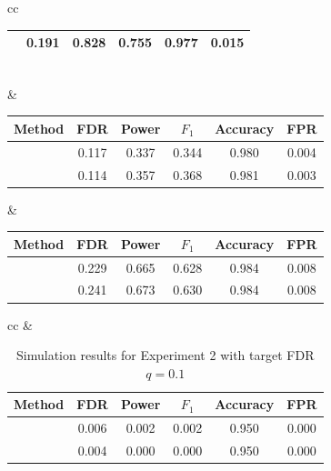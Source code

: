 ﻿\documentclass[12pt]{article}
\newcommand{\0}{\mbox{\bf 0}}
\theoremstyle{plain}%
\theoremstyle{definition}
\begin{document}
{\begin{table}[htbp]
\begin{tabular}{cc}
\begin{tabular}{lccccc}
\sc{Screening+Fixed-X} & 0.191 & 0.828 & 0.755 & 0.977 & 0.015 \\

			\bottomrule
		\end{tabular}
		\\[1em]
		
		 &  \\
		\begin{tabular}{lccccc}
			\toprule
			Method & FDR & Power & $F_1$ & Accuracy & FPR \\
			\midrule
\sc{Screening+Model-X} & 0.117 & 0.337 & 0.344 & 0.980 & 0.004 \\

\sc{Screening+Fixed-X} & 0.114 & 0.357 & 0.368 & 0.981 & 0.003 \\

			\bottomrule
		\end{tabular}
		&
		\begin{tabular}{lccccc}
			\toprule
			Method & FDR & Power & $F_1$ & Accuracy & FPR \\
			\midrule
\sc{Screening+Model-X} & 0.229 & 0.665 & 0.628 & 0.984 & 0.008 \\

\sc{Screening+Fixed-X} & 0.241 & 0.673 & 0.630 & 0.984 & 0.008 \\

			\bottomrule
		\end{tabular}
	\end{tabular}
\end{table}


\begin{table}[htbp]
\caption{Simulation results for Experiment 2 with target FDR $q = 0.1$}
\label{tab:dgp2A_fdr0.1}
\centering
\scriptsize
\setlength{\tabcolsep}{2pt}
\renewcommand{\arraystretch}{1.05}
\begin{tabular}{cc}
 &  \\
\begin{tabular}{lccccc}
\toprule
Method & FDR & Power & $F_1$ & Accuracy & FPR \\
\midrule
\sc{Screening+Model-X} & 0.006 & 0.002 & 0.002 & 0.950 & 0.000 \\

\sc{Screening+Fixed-X} & 0.004 & 0.000 & 0.000 & 0.950 & 0.000 \\


\end{tabular}
\end{tabular}
\end{table}}
\end{document}
